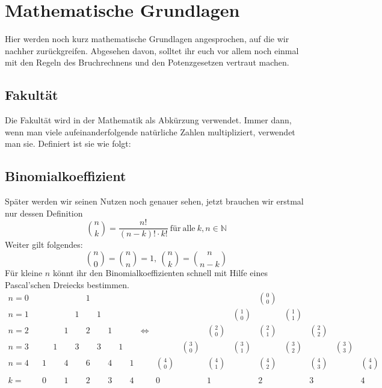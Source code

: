 \section{Mathematische Grundlagen}
	Hier werden noch kurz mathematische Grundlagen angesprochen, auf die wir
	nachher zurückgreifen. Abgesehen davon, solltet ihr euch vor allem noch einmal
	mit den Regeln des Bruchrechnens und den Potenzgesetzen vertraut machen.

	\subsection{Fakultät}
		Die Fakultät wird in der Mathematik als Abkürzung verwendet. Immer dann, wenn
		man viele aufeinanderfolgende natürliche Zahlen multipliziert, verwendet man
		sie. Definiert ist sie wie folgt:
		\formel{\[n!=1\cdot 2\cdot \ldots \cdot (n-1)\cdot n\ \&\ 0!=1\]}

	\subsection{Binomialkoeffizient}
		Später werden wir seinen Nutzen noch genauer sehen, jetzt brauchen wir erstmal
		nur dessen Definition
		\[\binom{n}{k}=\frac{n!}{(n-k)!\cdot k!}\mathrm{\ für\ alle\ }k,n\in
		\mathbb{N}\]
		Weiter gilt folgendes:
		\[\binom{n}{0}=\binom{n}{n}=1,\ \binom{n}{k}=\binom{n}{n-k}\]
		Für kleine \(n\) könnt ihr den Binomialkoeffizienten schnell mit Hilfe eines
		Pascal'schen Dreiecks bestimmen.\\
		\(
			\begin{array}{ccccccccccccccccccccc}
				n=0 &  &  &  &  &  & 1 &  &  &  &  &  &  &  &  &  & \binom{0}{0} &  &  &  & \\ 
				n=1 &  &  &  &  & 1 &  & 1 &  &  &  &  &  &  &  & \binom{1}{0} &  &
				\binom{1}{1} &  &  & \\
				n=2 &  &  &  & 1 &  & 2 &  & 1 &  &  & \Leftrightarrow &  &  & \binom{2}{0} & 
				& \binom{2}{1} &  & \binom{2}{2} &  & \\
				n=3 &  &  & 1 &  & 3 &  & 3 &  & 1 &  &  &  & \binom{3}{0} &  & \binom{3}{1} & 
				& \binom{3}{2} &  & \binom{3}{3} & \\
				n=4 &  & 1 &  & 4 &  & 6 &  & 4 &  & 1 &  & \binom{4}{0} &  & \binom{4}{1} & 
				& \binom{4}{2} &  & \binom{4}{3} &  & \binom{4}{4}\\
				 & && && && && && && && && && &\\
				k= & &0& &1& &2& &3& &4& &0& &1& &2& &3& &4   
			\end{array} 
		\)

